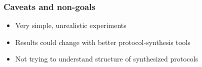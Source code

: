 \begin{frame}
\frametitle{Caveats and non-goals}
\begin{itemize}
\item Very simple, unrealistic experiments
\item Results could change with better protocol-synthesis tools
\item Not trying to understand structure of synthesized protocols
\end{itemize}
\end{frame}
